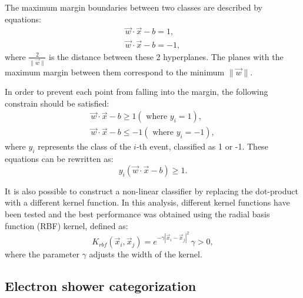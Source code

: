The maximum margin boundaries between two classes are described by equations:
\begin{eqnarray}
\vec{w}\cdot \vec{x} - b = 1, \\
\vec{w}\cdot \vec{x} - b = -1,
\end{eqnarray}
where $\frac{2}{\|\vec{w}\|}$ is the distance between these 2 hyperplanes. The planes with the maximum margin between them correspond to the minimum $\|\vec{w}\|$. 

In order to prevent each point from falling into the margin, the following constrain should be satisfied: 
\begin{eqnarray}
\vec{w}\cdot \vec{x} - b \geqslant 1 (\textrm{ where } y_i = 1),\\
\vec{w}\cdot \vec{x} - b \leqslant -1 (\textrm{ where } y_i = -1),
\end{eqnarray}
where $y_i$ represents the class of the $i$-th event, classified as 1 or -1. These equations can be rewritten as:
\begin{equation}
y_i(\vec{w}\cdot \vec{x} - b ) \geqslant 1.
\end{equation}

It is also possible to construct a non-linear classifier by replacing the dot-product with a different kernel function. In this analysis, different kernel functions have been tested and the best performance was obtained using the radial basis function (RBF) kernel, defined as:
\begin{equation}\label{eq:RBF}
K_{rbf}(\vec{x}_i, \vec{x}_j) = e^{-\gamma | \vec{x}_i - \vec{x}_j|^2} \, \gamma >0,
\end{equation}
where the parameter $\gamma$ adjusts the width of the kernel.




\subsection{Electron shower categorization}

\begin{figure}[!tbp]
\end{figure}

